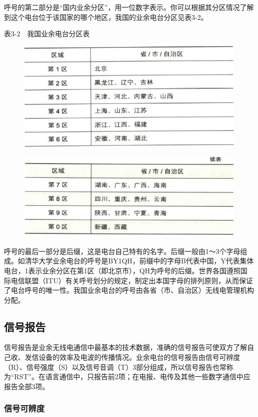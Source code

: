 \documentclass[12pt,UTF8]{ctexbook}
\begin{document}
呼号的第二部分是“国内业余分区”，用一位数字表示。你可以根据其分区情况了解到这个电台位于该国家的哪个地区，我国的业余电台分区见表3-2。

表3-2　我国业余电台分区表

\begin{figure}[htbp]
	\centering
	\includegraphics[width=0.7\linewidth]{31}
	\caption{}
	\label{fig:1}
\end{figure}

\begin{figure}[htbp]
	\centering
	\includegraphics[width=0.7\linewidth]{32}
	\caption{}
	\label{fig:1}
\end{figure}

呼号的最后一部分是后缀，这是电台自己特有的名字。后缀一般由1～3个字母组成。如清华大学业余电台的呼号是BY1QH，前缀中的字母B代表中国，Y代表集体电台，1表示业余分区在第1区（即北京市），QH为呼号的后缀。世界各国遵照国际电信联盟（ITU）有关呼号划分的规定，制定出本国字母的排列原则，从而保证了电台呼号的唯一性。我国业余电台的呼号由各省（市、自治区）无线电管理机构分配。

\subsection{信号报告}

信号报告是业余无线电通信中最基本的技术数据，准确的信号报告可使双方了解自己收、发信设备的效率及电波的传播情况。业余电台的信号报告由信号可辨度（R）、信号强度（S）以及信号音调（T）3部分组成，所以信号报告也常称为“RST”。在语言通信中，只报告前2项；在电报、电传及其他一些数字通信中应报告全部3项。

\subsubsection{信号可辨度}
\end{document}
